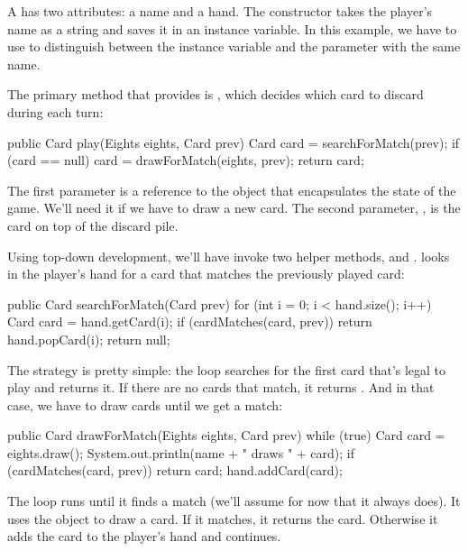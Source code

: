 A  has two  attributes: a name and a hand.
The constructor takes the player's name as a string and saves it in an instance variable.
In this example, we have to use  to distinguish between the instance variable and the parameter with the same name.

The primary method that  provides is , which decides which card to discard during each turn:

\begin{code}
public Card play(Eights eights, Card prev) {
    Card card = searchForMatch(prev);
    if (card == null) {
        card = drawForMatch(eights, prev);
    }
    return card;
}
\end{code}

The first parameter is a reference to the  object that encapsulates the state of the game.
We'll need it if we have to draw a new card.
The second parameter, , is the card on top of the discard pile.


Using top-down development, we'll have  invoke two helper methods,  and .
 looks in the player's hand for a card that matches the previously played card:

\begin{code}
public Card searchForMatch(Card prev) {
    for (int i = 0; i < hand.size(); i++) {
        Card card = hand.getCard(i);
        if (cardMatches(card, prev)) {
            return hand.popCard(i);
        }
    }
    return null;
}
\end{code}

The strategy is pretty simple: the  loop searches for the first card that's legal to play and returns it.
If there are no cards that match, it returns .
And in that case, we have to draw cards until we get a match:

\begin{code}
public Card drawForMatch(Eights eights, Card prev) {
    while (true) {
        Card card = eights.draw();
        System.out.println(name + " draws " + card);
        if (cardMatches(card, prev)) {
            return card;
        }
        hand.addCard(card);
    }
}
\end{code}

The  loop runs until it finds a match (we'll assume for now that it always does).
It uses the  object to draw a card.
If it matches, it returns the card.
Otherwise it adds the card to the player's hand and continues.


